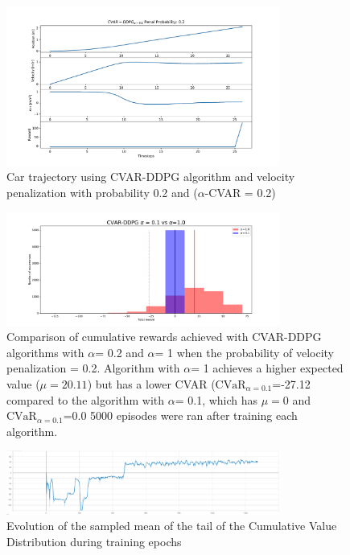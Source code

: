 \begin{figure}[ht]
        \centering
        \includegraphics[width=0.8\textwidth]{images/Car/CVAR/Trajectory_CVAR_ppenal02.pdf}
        \caption{Car trajectory using CVAR-DDPG algorithm and velocity penalization with probability 0.2 and ($\alpha$-CVAR = 0.2)}
        \label{traj_cvar_ddpg_probpenal0.2_cvar0.2}
    
\end{figure}

\begin{figure}[ht]
        \centering
        \includegraphics[width=0.8\textwidth]{images/Car/histogram_rewards1vs01.pdf}
        \caption{Comparison of cumulative rewards achieved with CVAR-DDPG  algorithms with $\alpha$= 0.2
        and $\alpha$= 1 when the probability of velocity penalization = 0.2.
        Algorithm with $\alpha$= 1 achieves a higher expected value ($\mu=20.11$) but 
        has a lower CVAR ($\text{CVaR}_{\alpha= 0.1}$=-27.12 compared to the algorithm
        with $\alpha$= 0.1, which has $\mu=0$ and $\text{CVaR}_{\alpha= 0.1}$=0.0
        5000 episodes were ran after training each algorithm. }
        \label{histogram_alpha01_vs_alpha1}
    
\end{figure}

\begin{figure}[ht]
        \centering
        \includegraphics[width=0.8\textwidth]{images/Car/CVAR/Cvar_evol.png}
        \caption{Evolution of the sampled mean of the tail of the Cumulative Value Distribution during training epochs}
        \label{tail_CDF_EVOL}
    
\end{figure}




